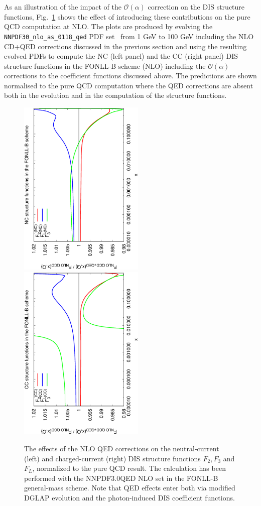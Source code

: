 As an illustration of the impact of the $\mathcal{O}(\alpha)$
correction on the DIS structure functions, Fig.~\ref{fig:StructFuncs}
shows the effect of introducing these contributions on the pure QCD
computation at NLO. The plots are produced by evolving the {\tt
  NNPDF30\_nlo\_as\_0118\_qed} PDF set~\cite{Bertone:2016ume} from 1
GeV to 100 GeV including the NLO CD+QED corrections discussed in the
previous section and using the resulting evolved PDFs to compute the
NC (left panel) and the CC (right panel) DIS structure functions in
the FONLL-B scheme (NLO) including the $\mathcal{O}(\alpha)$
corrections to the coefficient functions discussed above. The
predictions are shown normalised to the pure QCD computation where the
QED corrections are absent both in the evolution and in the
computation of the structure functions.

\begin{figure}[t]
\includegraphics[width=6cm,angle=270]{figs/NLOQEDCorrections_NC.eps}
\includegraphics[width=6cm,angle=270]{figs/NLOQEDCorrections_CC.eps}
\caption{The effects of the NLO QED corrections on the neutral-current
(left) and charged-current (right) DIS structure functions
$F_2, F_3$ and $F_L$, normalized to the pure QCD result.
%
The calculation has been performed with the NNPDF3.0QED NLO
set in the FONLL-B general-mass scheme.
%
Note that QED effects enter both via modified DGLAP evolution and the
photon-induced DIS coefficient functions.}
\label{fig:StructFuncs}
\end{figure}

